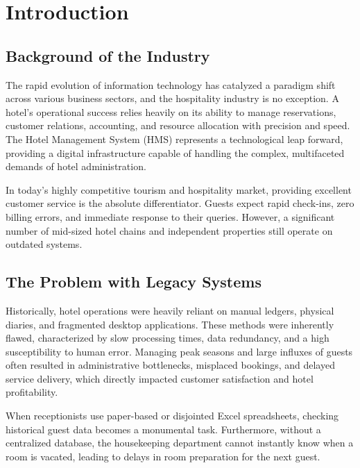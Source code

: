 \documentclass[12pt,a4paper]{article}
\begin{document}
\newpage
{}
\setcounter{page}{1}

\section{Introduction}

\subsection{Background of the Industry}
The rapid evolution of information technology has catalyzed a paradigm shift across various business sectors, and the hospitality industry is no exception. A hotel's operational success relies heavily on its ability to manage reservations, customer relations, accounting, and resource allocation with precision and speed. The Hotel Management System (HMS) represents a technological leap forward, providing a digital infrastructure capable of handling the complex, multifaceted demands of hotel administration. 

In today's highly competitive tourism and hospitality market, providing excellent customer service is the absolute differentiator. Guests expect rapid check-ins, zero billing errors, and immediate response to their queries. However, a significant number of mid-sized hotel chains and independent properties still operate on outdated systems.

\subsection{The Problem with Legacy Systems}
Historically, hotel operations were heavily reliant on manual ledgers, physical diaries, and fragmented desktop applications. These methods were inherently flawed, characterized by slow processing times, data redundancy, and a high susceptibility to human error. Managing peak seasons and large influxes of guests often resulted in administrative bottlenecks, misplaced bookings, and delayed service delivery, which directly impacted customer satisfaction and hotel profitability. 

When receptionists use paper-based or disjointed Excel spreadsheets, checking historical guest data becomes a monumental task. Furthermore, without a centralized database, the housekeeping department cannot instantly know when a room is vacated, leading to delays in room preparation for the next guest.
\end{document}
